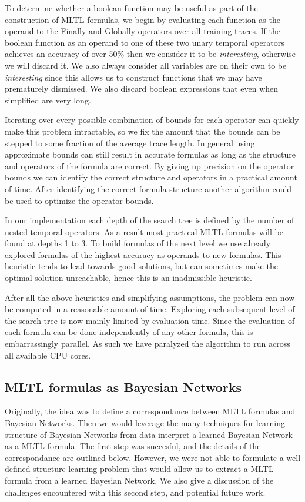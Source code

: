 \documentclass[12pt]{article}
\begin{document}
To determine whether a boolean function may be useful as part of the construction of MLTL formulas, we begin by evaluating each function as the operand to the Finally and Globally operators over all training traces. If the boolean function as an operand to one of these two unary temporal operators achieves an accuracy of over 50\% then we consider it to be \textit{interesting}, otherwise we will discard it. We also always consider all variables are on their own to be \textit{interesting} since this allows us to construct functions that we may have prematurely dismissed. We also discard boolean expressions that even when simplified are very long. 

Iterating over every possible combination of bounds for each operator can quickly make this problem intractable, so we fix the amount that the bounds can be stepped to some fraction of the average trace length. In general using approximate bounds can still result in accurate formulas as long as the structure and operators of the formula are correct. By giving up precision on the operator bounds we can identify the correct structure and operators in a practical amount of time. After identifying the correct formula structure another algorithm could be used to optimize the operator bounds.

In our implementation each depth of the search tree is defined by the number of nested temporal operators. As a result most practical MLTL formulas will be found at depths 1 to 3. To build formulas of the next level we use already explored formulas of the highest accuracy as operands to new formulas. This heuristic tends to lead towards good solutions, but can sometimes make the optimal solution unreachable, hence this is an inadmissible heuristic.

After all the above heuristics and simplifying assumptions, the problem can now be computed in a reasonable amount of time. Exploring each subsequent level of the search tree is now mainly limited by evaluation time. Since the evaluation of each formula can be done independently of any other formula, this is embarrassingly parallel. As such we have paralyzed the algorithm to run across all available CPU cores.

\subsection{MLTL formulas as Bayesian Networks}

Originally, the idea was to define a correspondance between MLTL formulas and Bayesian Networks. 
Then we would leverage the many techniques for learning structure of Bayesian Networks from data interpret a learned Bayesian Network as a MLTL formula. 
The first step was succesful, and the details of the correspondance are outlined below.
However, we were not able to formulate a well defined structure learning problem that would allow us to extract a MLTL formula from a learned Bayesian Network. 
We also give a discussion of the challenges encountered with this second step, and potential future work.
\end{document}
